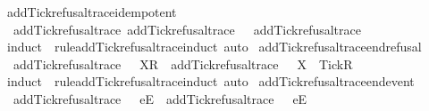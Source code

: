 \isanewline
{}\isamarkupfalse%
\ add{\isacharunderscore}Tick{\isacharunderscore}refusal{\isacharunderscore}trace{\isacharunderscore}idempotent{\isacharcolon}\isanewline
\ \ {\isachardoublequoteopen}add{\isacharunderscore}Tick{\isacharunderscore}refusal{\isacharunderscore}trace\ {\isacharparenleft}add{\isacharunderscore}Tick{\isacharunderscore}refusal{\isacharunderscore}trace\ {\isasymrho}{\isacharparenright}\ {\isacharequal}\ add{\isacharunderscore}Tick{\isacharunderscore}refusal{\isacharunderscore}trace\ {\isasymrho}{\isachardoublequoteclose}\isanewline
%
\isadelimproof
\ \ %
\endisadelimproof
%
\isatagproof
{}\isamarkupfalse%
\ {\isacharparenleft}induct\ {\isasymrho}\ rule{\isacharcolon}add{\isacharunderscore}Tick{\isacharunderscore}refusal{\isacharunderscore}trace{\isachardot}induct{\isacharcomma}\ auto{\isacharparenright}%
\endisatagproof
{\isafoldproof}%
%
\isadelimproof
\isanewline
%
\endisadelimproof
\isanewline
{}\isamarkupfalse%
\ add{\isacharunderscore}Tick{\isacharunderscore}refusal{\isacharunderscore}trace{\isacharunderscore}end{\isacharunderscore}refusal{\isacharcolon}\isanewline
\ \ {\isachardoublequoteopen}add{\isacharunderscore}Tick{\isacharunderscore}refusal{\isacharunderscore}trace\ {\isacharparenleft}{\isasymrho}\ {\isacharat}\ {\isacharbrackleft}{\isacharbrackleft}X{\isacharbrackright}\isactrlsub R{\isacharbrackright}{\isacharparenright}\ {\isacharequal}\ add{\isacharunderscore}Tick{\isacharunderscore}refusal{\isacharunderscore}trace\ {\isasymrho}\ {\isacharat}\ {\isacharbrackleft}{\isacharbrackleft}X\ {\isasymunion}\ {\isacharbraceleft}Tick{\isacharbraceright}{\isacharbrackright}\isactrlsub R{\isacharbrackright}{\isachardoublequoteclose}\isanewline
%
\isadelimproof
\ \ %
\endisadelimproof
%
\isatagproof
{}\isamarkupfalse%
\ {\isacharparenleft}induct\ {\isasymrho}\ rule{\isacharcolon}add{\isacharunderscore}Tick{\isacharunderscore}refusal{\isacharunderscore}trace{\isachardot}induct{\isacharcomma}\ auto{\isacharparenright}%
\endisatagproof
{\isafoldproof}%
%
\isadelimproof
\isanewline
%
\endisadelimproof
\isanewline
{}\isamarkupfalse%
\ add{\isacharunderscore}Tick{\isacharunderscore}refusal{\isacharunderscore}trace{\isacharunderscore}end{\isacharunderscore}event{\isacharcolon}\isanewline
\ \ {\isachardoublequoteopen}add{\isacharunderscore}Tick{\isacharunderscore}refusal{\isacharunderscore}trace\ {\isacharparenleft}{\isasymrho}\ {\isacharat}\ {\isacharbrackleft}{\isacharbrackleft}e{\isacharbrackright}\isactrlsub E{\isacharbrackright}{\isacharparenright}\ {\isacharequal}\ add{\isacharunderscore}Tick{\isacharunderscore}refusal{\isacharunderscore}trace\ {\isasymrho}\ {\isacharat}\ {\isacharbrackleft}{\isacharbrackleft}e{\isacharbrackright}\isactrlsub E{\isacharbrackright}{\isachardoublequoteclose}\isanewline
